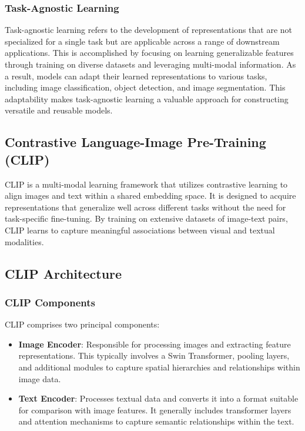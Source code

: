 \subsubsection{Task-Agnostic Learning}
\label{subsec:task_agnostic_learning}
Task-agnostic learning refers to the development of representations that are not specialized for a single task but are applicable across a range of downstream applications. This is accomplished by focusing on learning generalizable features through training on diverse datasets and leveraging multi-modal information. As a result, models can adapt their learned representations to various tasks, including image classification, object detection, and image segmentation. This adaptability makes task-agnostic learning a valuable approach for constructing versatile and reusable models.

\subsection{Contrastive Language-Image Pre-Training (CLIP)}
\label{subsec:clip}

CLIP \cite{vl_clip} is a multi-modal learning framework that utilizes contrastive learning to align images and text within a shared embedding space. It is designed to acquire representations that generalize well across different tasks without the need for task-specific fine-tuning. By training on extensive datasets of image-text pairs, CLIP learns to capture meaningful associations between visual and textual modalities.

\subsection{CLIP Architecture}
\label{subsec:clip_architecture}

\subsubsection{CLIP Components}
CLIP comprises two principal components:

\begin{itemize}
    \item \textbf{Image Encoder}: Responsible for processing images and extracting feature representations. This typically involves a Swin Transformer, pooling layers, and additional modules to capture spatial hierarchies and relationships within image data.
    \item \textbf{Text Encoder}: Processes textual data and converts it into a format suitable for comparison with image features. It generally includes transformer layers and attention mechanisms to capture semantic relationships within the text.
\end{itemize}


